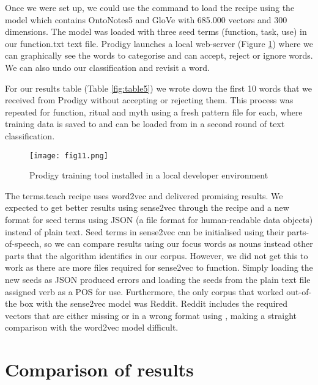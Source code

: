\documentclass[12pt, usenames, dvipsnames]{report}
\begin{document}
\begin{flushleft}
Once we were set up, we could use the command  to load the  recipe using the  model which contains OntoNotes5 and GloVe with 685.000 vectors and 300 dimensions.
The model was loaded with three seed terms (function, task, use) in our function.txt text file.
Prodigy launches a local web-server (Figure \ref{fig:figure11}) where we can graphically see the words to categorise and can accept, reject or ignore words.
We can also undo our classification and revisit a word.

For our results table (Table \ref{fig:table5}) we wrote down the first 10 words that we received from Prodigy without accepting or rejecting them.
This process was repeated for function, ritual and myth using a fresh pattern file for each, where training data is saved to and can be loaded from in a second round of text classification.

\vspace*{1.2em}
\begin{figure}[!htbp]
  \hspace*{-3.666em}
  \texttt{[image: fig11.png]}
  \caption{Prodigy training tool installed in a local developer environment}
  \label{fig:figure11}
\end{figure}
\vspace*{1.2em}

The terms.teach recipe uses word2vec and delivered promising results.
We expected to get better results using sense2vec through the  recipe and a new format for seed terms using JSON (a file format for human-readable data objects) instead of plain text.
Seed terms in sense2vec can be initialised using their parts-of-speech, so we can compare results using our focus words as nouns instead other parts that the algorithm identifies in our corpus.
However, we did not get this to work as there are more files required for sense2vec to function.
Simply loading the new seeds as JSON produced errors and loading the seeds from the plain text file assigned verb as a POS for use.
Furthermore, the only corpus that worked out-of-the box with the sense2vec model was Reddit.
Reddit includes the required vectors that are either missing or in a wrong format using , making a straight comparison with the word2vec model difficult.


\section{Comparison of results}


\end{flushleft}
\end{document}

